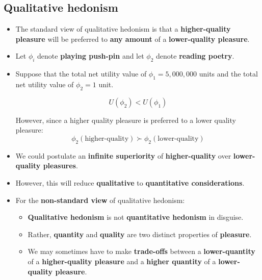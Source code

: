 \documentclass[11pt]{article}
\begin{document}
\subsection{Qualitative hedonism}
\label{sec:org6c2e5b5}
\begin{itemize}
\item The standard view of qualitative hedonism is that a \textbf{higher-quality pleasure} will be preferred to \textbf{any amount} of a \textbf{lower-quality pleasure}.
\item Let \(\phi_i\) denote \textbf{playing push-pin} and let \(\phi_2\) denote \textbf{reading poetry}.
\item Suppose that the total net utility value of \(\phi_1 = 5,000,000\) units and the total net utility value of \(\phi_2 = 1\) unit.

\[U(\phi_2) < U(\phi_1)\]

However, since a higher quality pleasure is preferred to a lower quality pleasure:
\[\phi_2 (\text{higher-quality}) \succ \phi_2 (\text{lower-quality})\]

\item We could postulate an \textbf{infinite superiority} of \textbf{higher-quality} over \textbf{lower-quality pleasures}.
\item However, this will reduce \textbf{qualitative} to \textbf{quantitative considerations}.
\item For the \textbf{non-standard view} of qualitative hedonism:
\begin{itemize}
\item \textbf{Qualitative hedonism} is not \textbf{quantitative hedonism} in disguise.
\item Rather, \textbf{quantity} and \textbf{quality} are two distinct properties of \textbf{pleasure}.
\item We may sometimes have to make \textbf{trade-offs} between a \textbf{lower-quantity} of a \textbf{higher-quality pleasure} and a \textbf{higher quantity} of a \textbf{lower-quality pleasure}.
\end{itemize}
\end{itemize}
\end{document}
